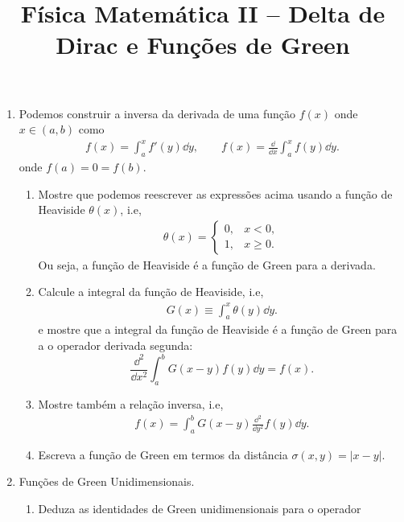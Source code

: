 \newif\ifuseseminar
\useseminartrue


\title{Física Matemática II -- Delta de Dirac e Funções de Green}


\begin{enumerate}
	\item Podemos construir a inversa da derivada de uma função $f(x)$ onde $x\in(a, b)$
	      como
	      \begin{align}
		      f(x) = \int_{a}^{x}f'(y)\dd y,\qquad f(x) = \frac{\dd}{\dd x}\int_{a}^{x}f(y)\dd y.
	      \end{align}
	      onde $f(a) = 0 = f(b)$.
	      \begin{enumerate}
		      \item Mostre que podemos reescrever as expressões acima usando a
		            função de Heaviside $\theta(x)$, i.e,
		            \begin{align}
			            \theta(x) = \begin{cases}
				                        0, & x<0,     \\
				                        1, & x\geq 0.
			                        \end{cases}
		            \end{align}
		            Ou seja, a função de Heaviside é a função de Green para a derivada.
		      \item Calcule a integral da função de Heaviside, i.e,
		            \begin{align}
			            G(x) \equiv \int_{a}^{x}\theta(y)\dd y.
		            \end{align}
		            e mostre que a integral da função de Heaviside é a função de Green
		            para a o operador derivada segunda:
		            $$\frac{\dd^2}{\dd x^2}\int_{a}^{b}G(x-y)f(y)\dd y = f(x).$$
		      \item Mostre também a relação inversa, i.e,
		            \begin{align}
			            f(x) = \int_{a}^{b}G(x-y)\frac{\dd^2}{\dd y^2}f(y)\dd y.
		            \end{align}
		      \item Escreva a função de Green em termos da distância $\sigma(x,y) = |x-y|$.
	      \end{enumerate}
	\item Funções de Green Unidimensionais.
	      \begin{enumerate}
		      \item Deduza as identidades de Green unidimensionais para o operador

\end{enumerate}
\end{enumerate}
